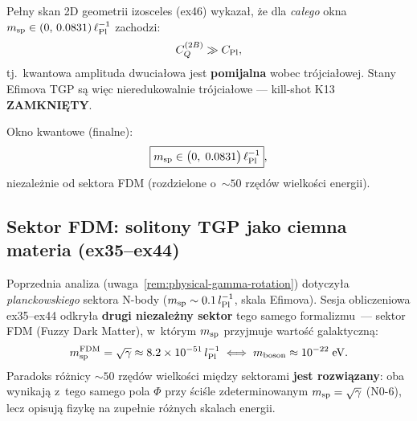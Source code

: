 \begin{remark}%
\label{rem:ex46-k13}
Pe\l{}ny skan 2D geometrii izosceles (ex46) wykaza\l{},
\.ze dla \emph{ca\l{}ego} okna $m_{\rm sp} \in (0,\, 0.0831)\,\ell_{\rm Pl}^{-1}$
zachodzi:
\begin{equation}\label{eq:k13-result}
  C_Q^{(2B)} \gg C_{\rm Pl},
\end{equation}
tj.\ kwantowa amplituda dwucia\l{}owa jest \textbf{pomijalna}
wobec tr\'ojcia\l{}owej.
Stany Efimova TGP s\k{a} wi\k{e}c nieredukowalnie tr\'ojcia\l{}owe
--- kill-shot K13 \textbf{ZAMKNI\k{E}TY}.

Okno kwantowe (finalne):
\begin{equation}\label{eq:efimov-window}
  \boxed{m_{\rm sp} \in \bigl(0,\; 0.0831\bigr)\,\ell_{\rm Pl}^{-1}},
\end{equation}
niezale\.znie od sektora FDM
(rozdzielone o~$\sim\!50$ rz\k{e}d\'ow wielko\'sci energii).
\end{remark}

\subsection{Sektor FDM: solitony TGP jako ciemna materia (ex35--ex44)}%
\label{ssec:fdm-sector}

\begin{remark}%
\label{rem:two-sectors}
Poprzednia analiza (uwaga~\ref{rem:physical-gamma-rotation}) dotyczy\l{}a
\emph{planckowskiego} sektora N-body ($m_{\rm sp} \sim 0.1\,l_{\rm Pl}^{-1}$,
skala Efimova). Sesja obliczeniowa ex35--ex44 odkry\l{}a \textbf{drugi
niezale\.zny sektor} tego samego formalizmu~--- sektor FDM
(Fuzzy Dark Matter), w~kt\'orym $m_{\rm sp}$ przyjmuje warto\'s\'c
galaktyczn\k{a}:
\begin{equation}
  m_{\rm sp}^{\rm FDM} = \sqrt{\gamma} \approx 8.2\times10^{-51}\,l_{\rm Pl}^{-1}
  \;\Longleftrightarrow\;
  m_{\rm boson} \approx 10^{-22}\;\mathrm{eV}.
\end{equation}
Paradoks r\'o\.znicy $\sim 50$ rz\k{e}d\'ow wielko\'sci mi\k{e}dzy
sektorami \textbf{jest rozwi\k{a}zany}: oba wynikaj\k{a} z~tego samego
pola $\Phi$ przy \'sci\'sle zdeterminowanym $m_{\rm sp} = \sqrt{\gamma}$
(N0-6), lecz opisuj\k{a} fizyk\k{e} na zupe\l{}nie r\'o\.znych skalach
energii.
\end{remark}

